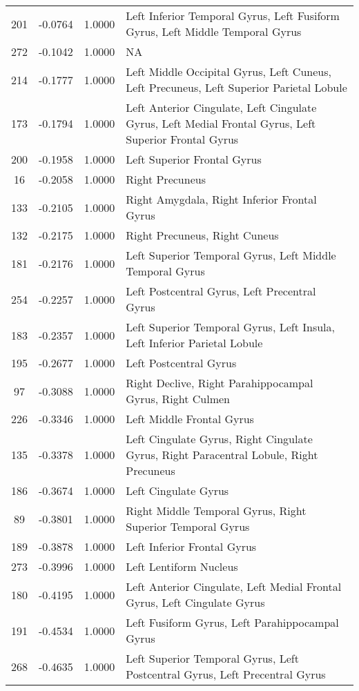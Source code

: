 \documentclass[10pt,letterpaper]{article}\usepackage[]{graphicx}\usepackage[]{color}
\begin{document}
\begin{center}
\begin{longtable}[c]{cccp{4in}}
		201	& -0.0764 & 1.0000 & Left Inferior Temporal Gyrus, Left Fusiform Gyrus, Left Middle Temporal Gyrus \\
		272	& -0.1042 & 1.0000 & NA \\
		214	& -0.1777 & 1.0000 & Left Middle Occipital Gyrus, Left Cuneus, Left Precuneus, Left Superior Parietal Lobule \\
		173	& -0.1794 & 1.0000 & Left Anterior Cingulate, Left Cingulate Gyrus, Left Medial Frontal Gyrus, Left Superior Frontal Gyrus \\
		200	& -0.1958 & 1.0000 & Left Superior Frontal Gyrus \\
		16	& -0.2058 & 1.0000 & Right Precuneus \\
		133	& -0.2105 & 1.0000 & Right Amygdala, Right Inferior Frontal Gyrus \\
		132	& -0.2175 & 1.0000 & Right Precuneus, Right Cuneus \\
		181	& -0.2176 & 1.0000 & Left Superior Temporal Gyrus, Left Middle Temporal Gyrus \\
		254	& -0.2257 & 1.0000 & Left Postcentral Gyrus, Left Precentral Gyrus \\
		183	& -0.2357 & 1.0000 & Left Superior Temporal Gyrus, Left Insula, Left Inferior Parietal Lobule \\
		195	& -0.2677 & 1.0000 & Left Postcentral Gyrus \\
		97	& -0.3088 & 1.0000 & Right Declive, Right Parahippocampal Gyrus, Right Culmen \\
		226	& -0.3346 & 1.0000 & Left Middle Frontal Gyrus \\
		135	& -0.3378 & 1.0000 & Left Cingulate Gyrus, Right Cingulate Gyrus, Right Paracentral Lobule, Right Precuneus \\
		186	& -0.3674 & 1.0000 & Left Cingulate Gyrus \\
		89	& -0.3801 & 1.0000 & Right Middle Temporal Gyrus, Right Superior Temporal Gyrus \\
		189	& -0.3878 & 1.0000 & Left Inferior Frontal Gyrus \\
		273	& -0.3996 & 1.0000 & Left Lentiform Nucleus \\
		180	& -0.4195 & 1.0000 & Left Anterior Cingulate, Left Medial Frontal Gyrus, Left Cingulate Gyrus \\
		191	& -0.4534 & 1.0000 & Left Fusiform Gyrus, Left Parahippocampal Gyrus \\
		268	& -0.4635 & 1.0000 & Left Superior Temporal Gyrus, Left Postcentral Gyrus, Left Precentral Gyrus \\

\end{longtable}
\end{center}
\end{document}

